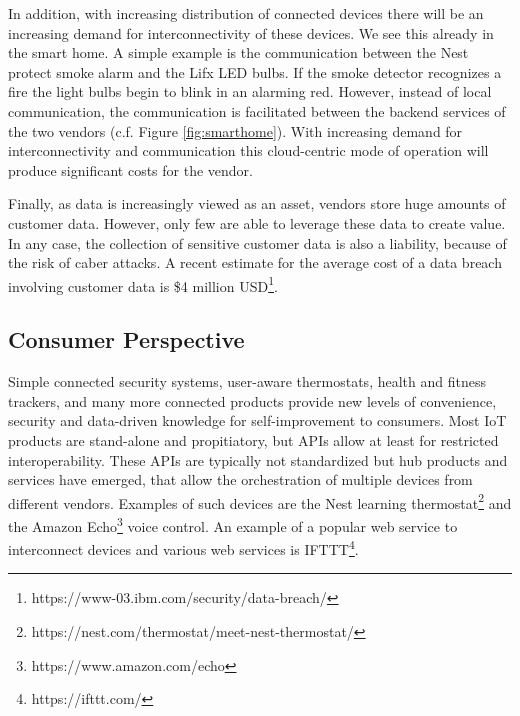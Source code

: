 In addition, with increasing distribution of connected devices there will be an increasing demand for interconnectivity of these devices. We see this already in the smart home. A simple example is the communication between the Nest protect smoke alarm and the Lifx LED bulbs. If the smoke detector recognizes a fire the light bulbs begin to blink in an alarming red. However, instead of local communication, the communication is facilitated between the backend services of the two vendors (c.f. Figure \ref{fig:smarthome}). With increasing demand for interconnectivity and communication this cloud-centric mode of operation will produce significant costs for the vendor.

Finally, as data is increasingly viewed as an asset, vendors store huge amounts of customer data. However, only few are able to leverage these data to create value. In any case, the collection of sensitive customer data is also a liability, because of the risk of caber attacks. A recent estimate for the average cost of a data breach involving customer data is \$4 million USD\footnote{https://www-03.ibm.com/security/data-breach/}.


\subsection{Consumer Perspective}

Simple connected security systems, user-aware thermostats, health and fitness trackers, and many more connected products provide new levels of convenience, security and data-driven knowledge for self-improvement to consumers. Most IoT products are stand-alone and propitiatory, but APIs allow at least for restricted interoperability. These APIs are typically not standardized but hub products and services have emerged, that allow the orchestration of multiple devices from different vendors. Examples of such devices are the Nest learning thermostat\footnote{https://nest.com/thermostat/meet-nest-thermostat/} and the Amazon Echo\footnote{https://www.amazon.com/echo} voice control. An example of a popular web service to interconnect devices and various web services is IFTTT\footnote{https://ifttt.com/}. 

